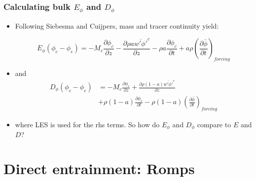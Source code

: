 \documentclass[fleqn,hyperref={colorlinks=true,linkcolor=blue,urlcolor=blue},numbers]{beamer}
\begin{document}
\begin{frame}
  \frametitle{Calculating bulk $E_\phi$ and $D_\phi$}

  \begin{itemize}
  \item Following Siebesma and Cuijpers, mass and tracer continuity yield:

\begin{equation*}
  \label{eq:siebesma_entrainment}
    E_{\phi}(\phi_c - \phi_e) = - M_c \frac{\partial \phi_c}{\partial z}
        - \frac{\partial \rho a \overline{w' \phi'}^c}{\partial z}
        - \rho a \frac{\partial \phi_c}{\partial t}
        + a \rho \left(\frac{\partial \bar{\phi}}{\partial t}\right)_{forcing}
\end{equation*} \pause

\item and
\begin{align*}
  \label{eq:siebesma_detrainment}
    D_{\phi}(\phi_c - \phi_e) &= - M_c \frac{\partial \phi_e}{\partial z}
        + \frac{\partial \rho (1 - a) \overline{w' \phi'}^e}{\partial z}
        \\
& + \rho (1-a) \frac{\partial \phi_e}{\partial t}
     - \rho (1-a) \left(\frac{\partial \bar{\phi}}{\partial t}\right)_{forcing}
\end{align*} \pause

\item where LES is used for the rhs terms.  So how do $E_\phi$ and $D_\phi$ compare to $E$ and $D$?

  \end{itemize}

\end{frame}

\section{Direct entrainment: Romps}
\label{sec:direct-entr-romps}
\end{document}
